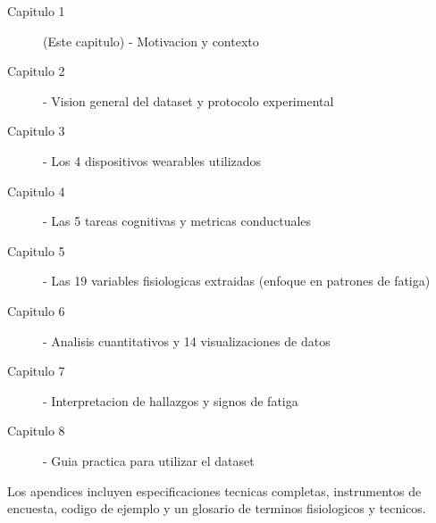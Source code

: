 \begin{description}
    \item[Capitulo 1] (Este capitulo) - Motivacion y contexto
    \item[Capitulo 2] - Vision general del dataset y protocolo experimental
    \item[Capitulo 3] - Los 4 dispositivos wearables utilizados
    \item[Capitulo 4] - Las 5 tareas cognitivas y metricas conductuales
    \item[Capitulo 5] - Las 19 variables fisiologicas extraidas (enfoque en patrones de fatiga)
    \item[Capitulo 6] - Analisis cuantitativos y 14 visualizaciones de datos
    \item[Capitulo 7] - Interpretacion de hallazgos y signos de fatiga
    \item[Capitulo 8] - Guia practica para utilizar el dataset
\end{description}

Los apendices incluyen especificaciones tecnicas completas, instrumentos de encuesta,
codigo de ejemplo y un glosario de terminos fisiologicos y tecnicos.
